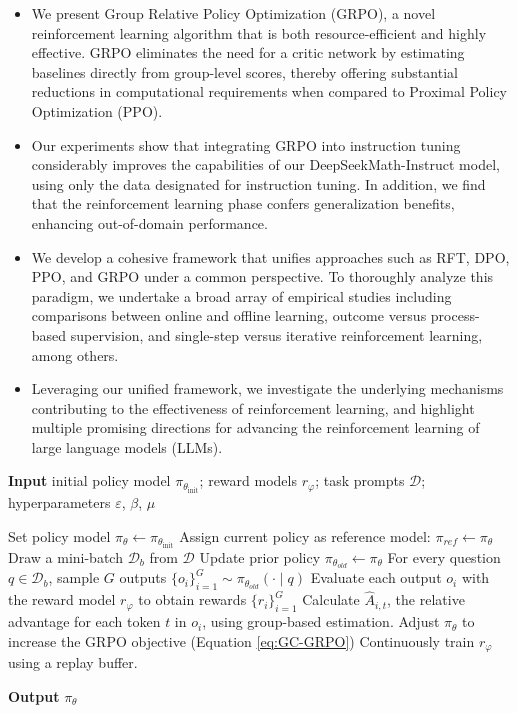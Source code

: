 \begin{itemize}[topsep=0pt]
    \item We present Group Relative Policy Optimization (GRPO), a novel reinforcement learning algorithm that is both resource-efficient and highly effective. GRPO eliminates the need for a critic network by estimating baselines directly from group-level scores, thereby offering substantial reductions in computational requirements when compared to Proximal Policy Optimization (PPO).
    \item Our experiments show that integrating GRPO into instruction tuning considerably improves the capabilities of our DeepSeekMath-Instruct model, using only the data designated for instruction tuning. In addition, we find that the reinforcement learning phase confers generalization benefits, enhancing out-of-domain performance.
    \item We develop a cohesive framework that unifies approaches such as RFT, DPO, PPO, and GRPO under a common perspective. To thoroughly analyze this paradigm, we undertake a broad array of empirical studies including comparisons between online and offline learning, outcome versus process-based supervision, and single-step versus iterative reinforcement learning, among others.
    \item Leveraging our unified framework, we investigate the underlying mechanisms contributing to the effectiveness of reinforcement learning, and highlight multiple promising directions for advancing the reinforcement learning of large language models (LLMs).
\end{itemize}

\begin{algorithm}[t]
  \small
  \caption{Iterative Group Relative Policy Optimization}
  \textbf{Input} initial policy model $\pi_{\theta_{\text{init}}}$; reward models $r_\varphi$; task prompts $\mathcal{D}$; 
  hyperparameters $\varepsilon$, $\beta$, $\mu$
  \begin{algorithmic}[1]
    \State Set policy model $\pi_\theta \leftarrow \pi_{\theta_{\text{init}}}$
       \State Assign current policy as reference model: $\pi_{ref} \leftarrow \pi_{\theta}$
      \State Draw a mini-batch $\mathcal{D}_b$ from $\mathcal{D}$
      \State Update prior policy $\pi_{\theta_{old}} \leftarrow \pi_{\theta}$ 
      \State For every question $q \in \mathcal{D}_b$, sample $G$ outputs $\{o_i\}_{i=1}^G \sim \pi_{\theta_{old}} (\cdot \mid q)$
      \State Evaluate each output $o_i$ with the reward model $r_{\varphi}$ to obtain rewards $\{r_i\}_{i=1}^{G}$
      \State Calculate $\hat{A}_{i,t}$, the relative advantage for each token $t$ in $o_i$, using group-based estimation.
        \State Adjust $\pi_{\theta}$ to increase the GRPO objective (Equation \ref{eq:GC-GRPO})
      \EndFor
    \EndFor \State Continuously train $r_\varphi$ using a replay buffer.
    \EndFor 
  \end{algorithmic}
  \textbf{Output} $\pi_\theta$
  \label{alg:iter-grpo}
\end{algorithm}

